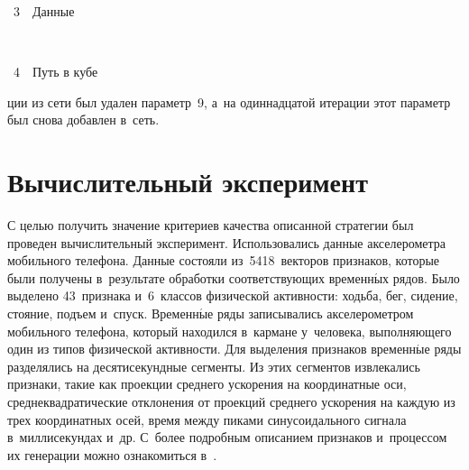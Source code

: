 \begin{multicols}{2}
\begin{center}
\vspace*{6pt}


{{\figurename~3}\ \ \small{Данные}}
\end{center}


\vspace*{6pt}


\addtocounter{figure}{1}

\begin{center}  %
\vspace*{1pt}
\mbox{%
 \epsfxsize=78.629mm
 }

\vspace*{6pt}


{{\figurename~4}\ \ \small{Путь в кубе}}
\end{center}




\addtocounter{figure}{1}

\noindent
ции из сети был удален параметр~9, а~на
одиннадцатой итерации этот параметр был снова добавлен в~сеть.

\section{Вычислительный эксперимент}

С целью получить значение критериев качества описанной стратегии был
проведен вычислительный эксперимент. Использовались данные
акселерометра мобильного телефона. Данные состояли из~5418~векторов
признаков, которые были получены в~результате обработки
соответствующих временн$\acute{\mbox{ы}}$х рядов. Было выделено 43~признака
и~6~классов физической активности: ходьба, бег, сидение, стояние, подъем
и~спуск. Временн$\acute{\mbox{ы}}$е ряды записывались акселерометром мобильного
телефона, который находился в~кармане у~человека, выполняющего один
из типов физической активности. Для выделения признаков временн$\acute{\mbox{ы}}$е
ряды разделялись на десятисекундные сегменты. Из этих сегментов
извлекались признаки, такие как проекции среднего ускорения на
координатные оси, среднеквадратические отклонения от проекций
среднего ускорения на каждую из трех координатных осей, время между
пиками синусоидального сигнала в~миллисекундах и~др. С~более
подробным описанием признаков и~процессом их генерации можно
ознакомиться в~\cite{Kwapisz2010Activity}.




\end{multicols}
